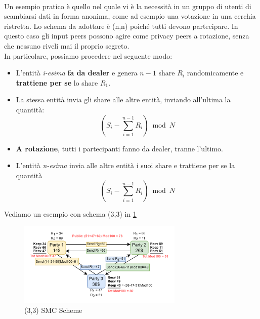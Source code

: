 \begin{example}\\
Un esempio pratico è quello nel quale vi è la necessità in un gruppo di utenti di scambiarsi dati in forma anonima, come ad esempio una votazione in una cerchia ristretta. Lo schema da adottare è (n,n) poiché tutti devono partecipare. In questo caso gli input peers possono agire come privacy peers a rotazione, senza che nessuno riveli mai il proprio segreto.\\
In particolare, possiamo procedere nel seguente modo:
\begin{itemize}
    \item L'entità \textit{i-esima} \textbf{fa da dealer} e genera $n-1$ share $R_i$ randomicamente e \textbf{trattiene per se} lo share $R_1$.
    \item La stessa entità invia gli share alle altre entità, inviando all'ultima la quantità: \[(S_i-\sum_{i=1}^{n-1}R_i)\bmod N\]
    \item \textbf{A rotazione}, tutti i partecipanti fanno da dealer, tranne l'ultimo.
    \item L'entità \textit{n-esima} invia alle altre entità i suoi share e trattiene per se la quantità \[(S_i-\sum_{i=1}^{n-1}R_i)\bmod N\]
\end{itemize}
Vediamo un esempio con schema (3,3) in \cref{fig:inputprivacy}
\begin{figure}[h]
\vspace{-10pt}
    \centering
    \includegraphics[width=0.7\textwidth]{image/secret_sharing/inputprivacy.png}
    \caption{(3,3) SMC Scheme}
    \label{fig:inputprivacy}
\end{figure}
\end{example}
